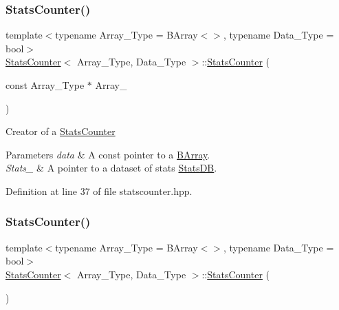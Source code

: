 \subsubsection{\texorpdfstring{Stats\+Counter()}{StatsCounter()}\hspace{0.1cm}{\footnotesize\ttfamily [1/2]}}
{\footnotesize\ttfamily template$<$typename Array\+\_\+\+Type  = B\+Array$<$$>$, typename Data\+\_\+\+Type  = bool$>$ \\
\hyperlink{class_stats_counter}{Stats\+Counter}$<$ Array\+\_\+\+Type, Data\+\_\+\+Type $>$\+::\hyperlink{class_stats_counter}{Stats\+Counter} (\begin{DoxyParamCaption}\item[{const Array\+\_\+\+Type $\ast$}]{Array\+\_\+ }\end{DoxyParamCaption})\hspace{0.3cm}{\ttfamily [inline]}}



Creator of a {\ttfamily \hyperlink{class_stats_counter}{Stats\+Counter}} 


\begin{DoxyParams}{Parameters}
{\em data} & A const pointer to a {\ttfamily \hyperlink{class_b_array}{B\+Array}}. \\
\hline
{\em Stats\+\_\+} & A pointer to a dataset of stats {\ttfamily \hyperlink{class_stats_d_b}{Stats\+DB}}. \\
\hline
\end{DoxyParams}


Definition at line 37 of file statscounter.\+hpp.

\mbox{\label{class_stats_counter_a6cef1e5bb4914a49ba8dd0f63070f81c}} 
\subsubsection{\texorpdfstring{Stats\+Counter()}{StatsCounter()}\hspace{0.1cm}{\footnotesize\ttfamily [2/2]}}
{\footnotesize\ttfamily template$<$typename Array\+\_\+\+Type  = B\+Array$<$$>$, typename Data\+\_\+\+Type  = bool$>$ \\
\hyperlink{class_stats_counter}{Stats\+Counter}$<$ Array\+\_\+\+Type, Data\+\_\+\+Type $>$\+::\hyperlink{class_stats_counter}{Stats\+Counter} (\begin{DoxyParamCaption}{ }\end{DoxyParamCaption})\hspace{0.3cm}{\ttfamily [inline]}}



